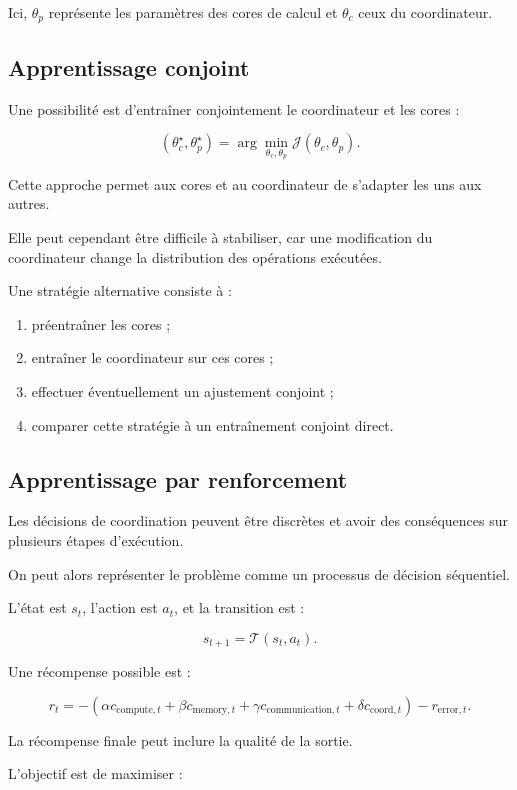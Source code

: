 \documentclass[11pt,a4paper]{article}
\begin{document}
Ici, $\theta_p$ représente les paramètres des cores de calcul
et $\theta_c$ ceux du coordinateur.

\subsection{Apprentissage conjoint}

Une possibilité est d'entraîner conjointement le coordinateur
et les cores :

\[
(\theta_c^\star,\theta_p^\star)
=
\arg\min_{\theta_c,\theta_p}
\mathcal{J}(\theta_c,\theta_p).
\]

Cette approche permet aux cores et au coordinateur de s'adapter
les uns aux autres.

Elle peut cependant être difficile à stabiliser, car une modification
du coordinateur change la distribution des opérations exécutées.

Une stratégie alternative consiste à :
\begin{enumerate}
  \item préentraîner les cores ;
  \item entraîner le coordinateur sur ces cores ;
  \item effectuer éventuellement un ajustement conjoint ;
  \item comparer cette stratégie à un entraînement conjoint direct.
\end{enumerate}

\subsection{Apprentissage par renforcement}

Les décisions de coordination peuvent être discrètes et avoir
des conséquences sur plusieurs étapes d'exécution.

On peut alors représenter le problème comme un processus
de décision séquentiel.

L'état est $s_t$, l'action est $a_t$, et la transition est :

\[
s_{t+1}
=
\mathcal{T}(s_t,a_t).
\]

Une récompense possible est :

\[
r_t
=
-\left(
\alpha c_{\mathrm{compute},t}
+\beta c_{\mathrm{memory},t}
+\gamma c_{\mathrm{communication},t}
+\delta c_{\mathrm{coord},t}
\right)
-r_{\mathrm{error},t}.
\]

La récompense finale peut inclure la qualité de la sortie.

L'objectif est de maximiser :
\end{document}
